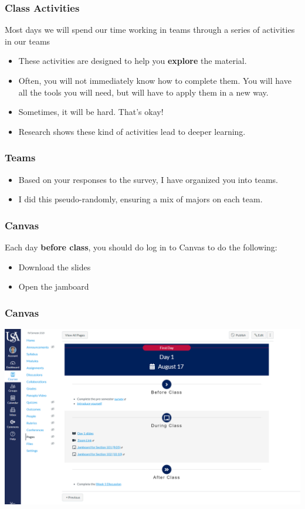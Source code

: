 \documentclass[aspectration=1610]{beamer}
\begin{document}
  
\begin{frame}\frametitle{Class Activities}
Most days we will spend our time working in teams through a series of activities in our teams
\begin{itemize}
\item These activities are designed to help you \textbf{explore} the material.
\item Often, you will not immediately know how to complete them.  You will have all the tools you will need, but will have to apply them in a new way.
\item Sometimes, it will be hard.  That's okay!
\item Research shows these kind of activities lead to deeper learning.
\end{itemize}

\end{frame}

\begin{frame}\frametitle{Teams}
\begin{itemize}
\item Based on your responses to the survey, I have organized you into teams.
\item I did this pseudo-randomly, ensuring a mix of majors on each team.
\end{itemize}
\end{frame}

\begin{frame}\frametitle{Canvas}
Each day \textbf{before class}, you should do log in to Canvas to do the following:
\begin{itemize}
\item Download the slides
\item Open the jamboard
\end{itemize}
\end{frame}

\begin{frame}\frametitle{Canvas}
  \begin{center}
  \includegraphics[scale=0.28]{canvas-daily.png}
  \end{center}
\end{frame}
\end{document}
